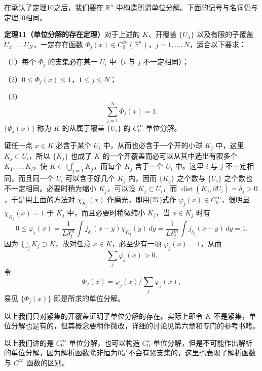 在承认了定理10之后，我们要在 $\mathbb R^n$ 中构造所谓单位分解。下面的记号与名词仍与定理10相同。

\noindent\textbf{定理11（单位分解的存在定理）}\quad 对于上述的 $K$、开覆盖 $\{U_\lambda\}$ 以及有限的子覆盖 $U_1,\ldots,U_N$，一定存在函数 $\Phi_j(x)\in C_0^\infty(\mathbb R^n)$，$j=1,\ldots,N$，适合以下要求：

（1）每个 $\Phi_j$ 的支集必在某一 $U_i$ 中（$i$ 与 $j$ 不一定相同）；

（2）$0\le\Phi_j(x)\le1$，$1\le j\le N$；

（3）
\begin{equation}
 \sum_{j=1}^N\Phi_j(x)=1.
 \tag{29}
\end{equation}
$\{\Phi_j(x)\}$ 称为 $K$ 的从属于覆盖 $\{U_i\}$ 的 $C_0^\infty$ 单位分解。

\noindent\textbf{证}\quad 任一点 $x\in K$ 必含于某个 $U_i$ 中，从而也必含于一个开的小球 $K_j$ 中，这里 $K_j\subset U_i$，所以 $\{K_j\}$ 也成了 $K$ 的一个开覆盖而必可以从其中选出有限多个 $K_1,\ldots,K_l$，使 $K\subset\bigcup_{j=1}^lK_j$，而每个 $K_j$ 含于一个 $U_i$ 中。这里 $i$ 与 $j$ 不一定相同，而且同一个 $U_i$ 可以含于好几个 $K_j$ 内，因而 $\{K_j\}$ 之个数与 $\{U_i\}$ 之个数也不一定相同。必要时稍为缩小 $K_j$，可以设 $K_j\subset U_i$，而 $\operatorname{dist}(K_j,\partial U_i)=\delta_j>0$，于是用上面的方法对 $\chi_{K_j}(x)$ 作磨光，即用(27)式作 $\varphi_j(x)\in C_0^\infty$，很明显 $\chi_{K_j}(x)=1$ 于 $K_j$ 中，而且必要时稍微缩小 $K_j$，当 $x\in K_j$ 时有
\[
 0\le\varphi_j(x)=\frac1{L\delta_j^m}\int j_{\delta_j}(x-y)\chi_{K_j}(y)\,dy
 =\frac1{L\delta_j^m}\int j_{\delta_j}(x-y)\,dy=1.
\]
因为 $\bigcup_jK_j\supset K$，故对任意 $x\in K$，必至少有一项 $\varphi_j(x)=1$，从而
\[
 \sum_j\varphi_j(x)>0.
\]
令
\[
 \Phi_j(x)=\varphi_j(x)\bigg/\sum_j\varphi_j(x),
\]
易见 $\{\Phi_j(x)\}$ 即是所求的单位分解。

以上我们只对紧集的开覆盖证明了单位分解的存在。实际上即令 $K$ 不是紧集，单位分解也是有的，但其概念要稍作微改，详细的讨论见第六章和专门的参考书籍。

以上我们讲的是 $C_0^\infty$ 单位分解，也可以构造 $C_0^\omega$ 单位分解，但是不可能作出解析的单位分解，因为解析函数除非恒为0是不会有紧支集的，这里也表现了解析函数与 $C^\infty$ 函数的区别。

